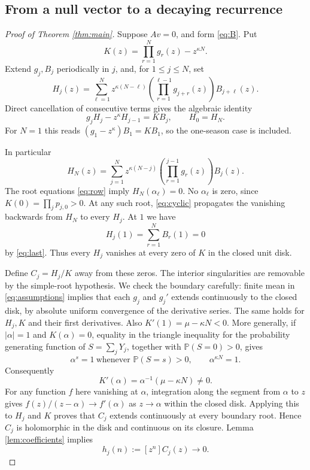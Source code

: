 \documentclass[11pt]{article}
\begin{document}
\subsection*{From a null vector to a decaying recurrence}
\begin{proof}[Proof of Theorem \ref{thm:main}]
Suppose $Av=0$, and form \eqref{eq:B}. Put
\[
 K(z)=\prod_{r=1}^N g_r(z)-z^{\kappa N}.
\]
Extend $g_j,B_j$ periodically in $j$, and, for $1\leq j\leq N$, set
\begin{equation}\label{eq:H}
 H_j(z)=\sum_{\ell=1}^N z^{\kappa(N-\ell)}
           \left(\prod_{r=1}^{\ell-1}g_{j+r}(z)\right)B_{j+\ell}(z).
\end{equation}
Direct cancellation of consecutive terms gives the algebraic identity
\begin{equation}\label{eq:cyclic}
 g_jH_j-z^\kappa H_{j-1}=K B_j,\qquad H_0=H_N.
\end{equation}
For $N=1$ this reads $(g_1-z^\kappa)B_1=KB_1$, so the
one-season case is included.

In particular
\[
 H_N(z)=\sum_{j=1}^N z^{\kappa(N-j)}
                  \left(\prod_{r=1}^{j-1}g_r(z)\right)B_j(z).
\]
The root equations \eqref{eq:row} imply $H_N(\alpha_\ell)=0$.
No $\alpha_\ell$ is zero, since $K(0)=\prod_jp_{j,0}>0$.
At any such root, \eqref{eq:cyclic} propagates the vanishing
backwards from $H_N$ to every $H_j$. At $1$ we have
\[
 H_j(1)=\sum_{r=1}^N B_r(1)=0
\]
by \eqref{eq:last}. Thus every $H_j$ vanishes at every zero
of $K$ in the closed unit disk.

Define $C_j=H_j/K$ away from these zeros. The interior
singularities are removable by the simple-root hypothesis.
We check the boundary carefully: finite mean in
\eqref{eq:assumptions} implies that each $g_j$ and $g_j'$
extends continuously to the closed disk, by absolute uniform
convergence of the derivative series. The same holds for $H_j,K$
and their first derivatives. Also $K'(1)=\mu-\kappa N<0$.
More generally, if $|\alpha|=1$ and $K(\alpha)=0$, equality in
the triangle inequality for the probability generating function
of $S=\sum_jY_j$, together with $\mathbb P(S=0)>0$, gives
\[
 \alpha^s=1\ \text{whenever }\mathbb P(S=s)>0,\qquad
 \alpha^{\kappa N}=1.
\]
Consequently
\begin{equation}\label{eq:boundary}
 K'(\alpha)=\alpha^{-1}(\mu-\kappa N)\ne0.
\end{equation}
For any function $f$ here vanishing at $\alpha$, integration
along the segment from $\alpha$ to $z$ gives
$f(z)/(z-\alpha)\to f'(\alpha)$ as $z\to\alpha$ within the
closed disk. Applying this to $H_j$ and $K$ proves that
$C_j$ extends continuously at every boundary root.
Hence $C_j$ is holomorphic in the disk and continuous on its closure.
Lemma \ref{lem:coefficients} implies
\[
 h_j(n):=[z^n]C_j(z)\longrightarrow0.
\]


\end{proof}
\end{document}
